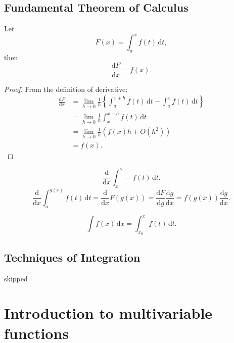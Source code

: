 \documentclass[10pt]{article}
\begin{document}
    \subsection{Fundamental Theorem of Calculus}
    \begin{theorem}[FTC]\label{thm:ftc}
        Let
        \[
            F(x) = \int_{a}^{x} f(t) \,\mathrm{d}t
        ,\]
        then
        \[
            \frac{\mathrm{d}F}{\mathrm{d}x} = f(x) 
        .\]
    \end{theorem}
    \begin{proof}
        From the definition of derivative:
        \[
            \begin{aligned}
                 \frac{\mathrm{d}F}{\mathrm{d}x} &= \lim_{h \to 0} \frac{1}{h} \left\{ \int_{a}^{x+h} f(t) \,\mathrm{d}t - \int_{a}^{x} f(t) \,\mathrm{d}t\right\}\\
                 &= \lim_{h \to 0} \frac{1}{h} \int_{x}^{x+h} f(t) \,\mathrm{d}t\\
                 &= \lim_{h \to 0} \frac{1}{h}\left( f(x)h+O(h^2) \right)\\
                 &= f(x).
            \end{aligned}
        \]
    \end{proof}
    \begin{corollary}\label{col:ftc}
            \[
                \frac{\mathrm{d}}{\mathrm{d}x}\int_{x}^{b} -f(t) \,\mathrm{d}t 
            .\]
            \[
                \frac{\mathrm{d}}{\mathrm{d}x} \int_{a}^{g(x)} f(t) \,\mathrm{d}t = \frac{\mathrm{d}}{\mathrm{d}x}F(g(x)) = \frac{\mathrm{d}F}{\mathrm{d}g} \frac{\mathrm{d}g}{\mathrm{d}x} = f(g(x))\frac{\mathrm{d}g}{\mathrm{d}x}   
            .\]
    \end{corollary}
    \begin{definition}
        \[
            \int f(x) \,\mathrm{d}x = \int_{x_0}^{x} f(t) \,\mathrm{d}t
        .\]
    \end{definition}
    \subsection{Techniques of Integration}
    skipped
    \section{Introduction to multivariable functions}
\end{document}
